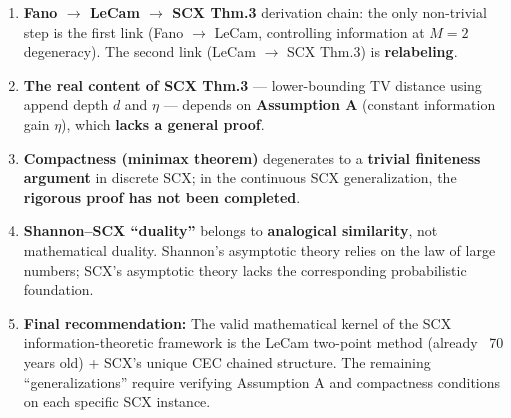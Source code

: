 \documentclass[12pt,a4paper]{article}
\theoremstyle{plain}
\theoremstyle{definition}
\begin{document}
\begin{honestbox}[title={Honest Critique Summary}]
\begin{enumerate}[leftmargin=*]
    \item \textbf{Fano $\to$ LeCam $\to$ SCX Thm.3} derivation chain:
    the only non-trivial step is the first link (Fano $\to$ LeCam, controlling information at $M=2$ degeneracy).
    The second link (LeCam $\to$ SCX Thm.3) is \textbf{relabeling}.

    \item \textbf{The real content of SCX Thm.3} --- lower-bounding TV distance using append depth $d$ and $\eta$ ---
    depends on \textbf{Assumption A} (constant information gain $\eta$), which \textbf{lacks a general proof}.

    \item \textbf{Compactness (minimax theorem)} degenerates to a \textbf{trivial finiteness argument} in discrete SCX;
    in the continuous SCX generalization, the \textbf{rigorous proof has not been completed}.

    \item \textbf{Shannon--SCX ``duality''} belongs to \textbf{analogical similarity}, not mathematical duality.
    Shannon's asymptotic theory relies on the law of large numbers; SCX's asymptotic theory lacks the corresponding probabilistic foundation.

    \item \textbf{Final recommendation:} The valid mathematical kernel of the SCX information-theoretic framework is the LeCam two-point method (already ~70 years old) + SCX's unique CEC chained structure. The remaining ``generalizations'' require verifying Assumption A and compactness conditions on each specific SCX instance.
\end{enumerate}
\end{honestbox}
\end{document}
